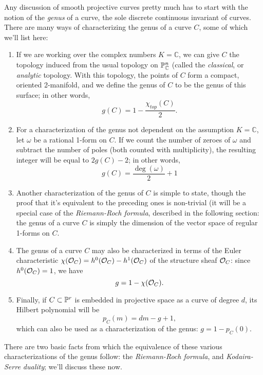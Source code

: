 \documentclass[12pt, leqno]{book}
\def\CC{{\mathbb C}}
\begin{document}
Any discussion of smooth projective curves pretty much has to start with the notion of the \emph{genus} of a curve, the sole discrete continuous invariant of curves. There are many ways of characterizing the genus of a curve $C$, some of which we'll list here:

\begin{enumerate}

\item If we are working over the complex numbers $K = \CC$, we can give $C$ the topology induced from the usual topology on $\PP^n_\CC$ (called the \emph{classical}, or \emph{analytic} topology. With this topology, the points of $C$ form a compact, oriented 2-manifold, and we define the genus of $C$ to be the genus of this surface; in other words,
$$
g(C) = 1 - \frac{\chi_{top}(C)}{2}.
$$

\item For a characterization of the genus not dependent on the assumption $K = \CC$, let $\omega$ be a rational 1-form on $C$. If we count the number of zeroes of $\omega$ and subtract the number of poles (both counted with multiplicity), the resulting integer will be equal to $2g(C) - 2$; in other words,
$$
g(C) = \frac{\deg(\omega)}{2} + 1
$$

\item Another characterization of the genus of $C$ is simple to state, though the proof that it's equivalent to the preceding ones is non-trivial (it will be a special case of the \emph{Riemann-Roch formula}, described in the following section: the genus of a curve $C$ is simply the dimension of the vector space of regular 1-forms on $C$.

\item The genus of a curve $C$ may also be characterized in terms of the Euler characteristic $\chi(\cO_C) = h^0(\cO_C) - h^1(\cO_C)$ of the structure sheaf $\cO_C$: since $h^0(\cO_C) = 1$, we have
$$
g = 1 - \chi(\cO_C).
$$

\item Finally, if $C \subset \PP^r$ is embedded in projective space as a curve of degree $d$, its Hilbert polynomial will be
$$
p_C(m) = dm - g + 1,
$$
which can also be used as a characterization of the genus: $g = 1 - p_C(0)$.

\end{enumerate}

There are two basic facts from which the equivalence of these various characterizations of the genus follow: the \emph{Riemann-Roch formula}, and \emph{Kodaira-Serre duality}; we'll discuss these now.
\end{document}
